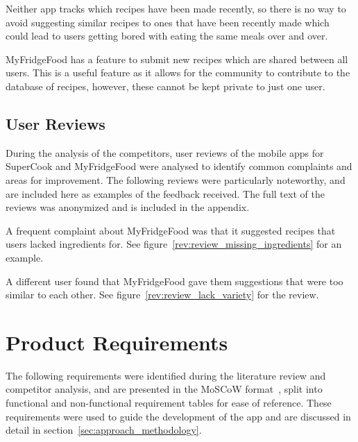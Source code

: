 Neither app tracks which recipes have been made recently, so there is no way to avoid suggesting similar recipes to ones that have been recently made which could lead to
users getting bored with eating the same meals over and over.

MyFridgeFood has a feature to submit new recipes which are shared between all users. This is a useful feature as it allows for the community to contribute to the database
of recipes, however, these cannot be kept private to just one user.

\subsection{User Reviews}

During the analysis of the competitors, user reviews of the mobile apps for SuperCook and MyFridgeFood
were analysed to identify common complaints and areas for improvement. The following reviews were particularly
noteworthy, and are included here as examples of the feedback received. The full text of the reviews was anonymized
and is included in the appendix.

A frequent complaint about MyFridgeFood was that it suggested
recipes that users lacked ingredients for. See figure~\ref{rev:review_missing_ingredients} for an example.

A different user found that MyFridgeFood gave them suggestions that were too similar to each
other. See figure~\ref{rev:review_lack_variety} for the review.

\section{Product Requirements}

The following requirements were identified during the literature review and competitor analysis,
and are presented in the MoSCoW format~\cite{clegg_case_1994}, split into functional and non-functional
requirement tables for ease of reference. These requirements were used to guide the development of the
\chef{} app and are discussed in detail in section~\ref{sec:approach_methodology}.

\newcommand{\requirementtype}{FR}
\newcommand{\requirement}[4]{%
    \requirementtype\stepcounter{functionalreqcounter}\arabic{functionalreqcounter}%
    &\raggedright#1&#2&#3&#4\\}

